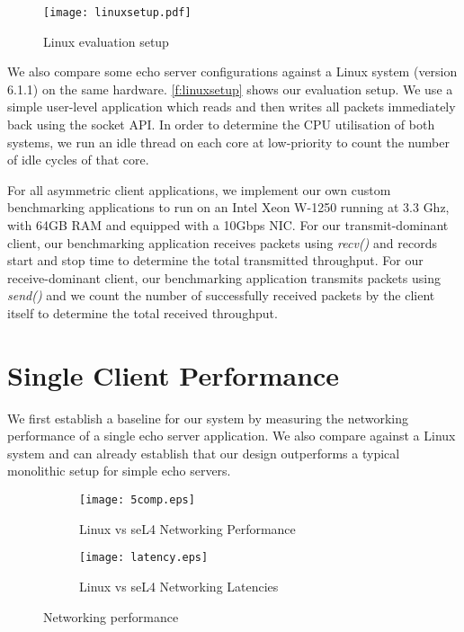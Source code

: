 \begin{figure}[h]
    \centering
    \texttt{[image: linuxsetup.pdf]}
    \caption{Linux evaluation setup}
    \label{f:linuxsetup}
\end{figure}

We also compare some echo server configurations against a Linux system (version 6.1.1) on the same hardware. \autoref{f:linuxsetup}
shows our evaluation setup. We use a simple user-level application which reads and then writes all packets immediately 
back using the socket API. In order to determine the CPU utilisation of both systems, we run an idle thread on each core
at low-priority to count the number of idle cycles of that core. 

For all asymmetric client applications, we implement our own custom benchmarking applications to run on an Intel Xeon W-1250
running at 3.3 Ghz, with 64GB RAM and equipped with a 10Gbps NIC. For our transmit-dominant client, our benchmarking
application receives packets using \emph{recv()} and records start and stop time to determine the total transmitted
throughput. For our receive-dominant client, our benchmarking application transmits packets using \emph{send()} and
we count the number of successfully received packets by the client itself to determine the total received throughput.

\section{Single Client Performance}

We first establish a baseline for our system by measuring the networking performance of a single echo server application. 
We also compare against a Linux system and can already establish that our design outperforms a typical monolithic setup 
for simple echo servers. 

\noindent\begin{figure}[H]
    \centering
	\begin{multicols}{2}
		\begin{subfigure}[b]{0.45\textwidth}
        \centering
        \texttt{[image: 5comp.eps]}
        \caption{Linux vs seL4 Networking Performance}
        \label{f:perf}
    \end{subfigure}\qquad
    \begin{subfigure}[b]{0.45\textwidth}
        \centering
        \vspace{0.15cm}
        \texttt{[image: latency.eps]}
        \caption{Linux vs seL4 Networking Latencies}
        \label{f:perf_latencies}
    \end{subfigure}
\end{multicols}
\caption{Networking performance }
\label{f:AgtB_RxU32}
\end{figure}

